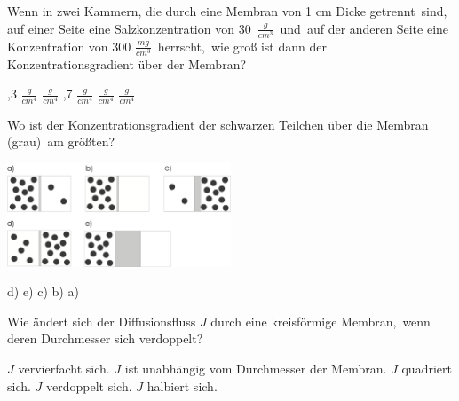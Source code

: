 \documentclass[11pt]{exam}
\begin{document}
\setlength{\voffset}{-0.5in}
\setlength{\headsep}{5pt}

\hspace{2mm}
 \hspace{5mm}
\vspace{4mm}

\begin{questions}

\question Wenn in zwei Kammern, die durch eine Membran von 1 cm Dicke getrennt sind, auf einer Seite eine Salzkonzentration von 30 \( \frac{g}{cm^3} \) und auf der anderen Seite eine Konzentration von 300 \( \frac{mg}{cm^3} \) herrscht, wie groß ist dann der Konzentrationsgradient über der Membran?

\begin{choices}
	,3 \( \frac{g}{cm^4} \)
	 \( \frac{g}{cm^4} \)
	,7 \( \frac{g}{cm^4} \)
	 \( \frac{g}{cm^4} \)
	 \( \frac{g}{cm^4} \)
\end{choices}

\vspace{3mm}\question Wo ist der Konzentrationsgradient der schwarzen Teilchen über die Membran (grau) am größten? 

\includegraphics[width=0.5\textwidth]{../../../questions/E/images/Diffusion.png}

\begin{choices}
	\choice d)
	\choice e)
	\choice c)
	\choice b)
	\choice a)
\end{choices}

\vspace{3mm}\question Wie ändert sich der Diffusionsfluss \( J \) durch eine kreisförmige Membran, wenn deren Durchmesser sich verdoppelt?

\begin{choices}
	\choice \( J \) vervierfacht sich.
	\choice \( J \) ist unabhängig vom Durchmesser der Membran.
	\choice \( J \) quadriert sich.
	\choice \( J \) verdoppelt sich.
	\choice \( J \) halbiert sich.
\end{choices}


\end{questions}
\end{document}
